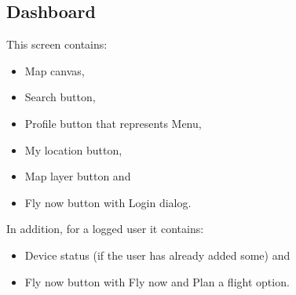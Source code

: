 \subsection{Dashboard}\label{subsec:dashboard2}
This screen contains:
\begin{itemize}
    \item Map canvas,
    \item Search button,
    \item Profile button that represents Menu,
    \item My location button,
    \item Map layer button and
    \item Fly now button with Login dialog.
\end{itemize}
In addition, for a logged user it contains:
\begin{itemize}
    \item Device status (if the user has already added some) and
    \item Fly now button with Fly now and Plan a flight option.
\end{itemize}
